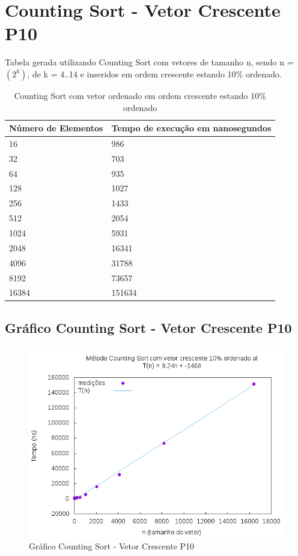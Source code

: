 \documentclass[12pt,a4paper,twoside]{report}
\begin{document}
\section{Counting Sort - Vetor Crescente P10}
Tabela gerada utilizando Counting Sort com vetores de tamanho n, sendo n = $(2^k)$, de k = 4..14 e inseridos em ordem crescente estando 10\% ordenado.
\begin{table}[H]
\centering
\caption{Counting Sort com vetor ordenado em ordem crescente estando 10\% ordenado}
\label{my-label}
\begin{tabular}{|l|l|}
\hline
\multicolumn{1}{|c|}{\textbf{Número de Elementos}} & \multicolumn{1}{c|}{\textbf{Tempo de execução em nanosegundos}} \\ \hline
16 & 986 \\ \hline
32 & 703 \\ \hline
64 & 935 \\ \hline
128 & 1027 \\ \hline
256 & 1433 \\ \hline
512 & 2054 \\ \hline
1024 & 5931 \\ \hline
2048 & 16341 \\ \hline
4096 & 31788 \\ \hline
8192 & 73657 \\ \hline
16384 & 151634 \\ \hline
\end{tabular}
\end{table}

\subsection{Gráfico Counting Sort - Vetor Crescente P10}
\begin{figure}[H]
    \centering
    \includegraphics[width=0.7\linewidth]{graficos/CountingSort/vIntCrescenteP10/vIntCrescenteP10.png}
  \caption{Gráfico Counting Sort - Vetor Crescente P10}
\end{figure}
\end{document}
